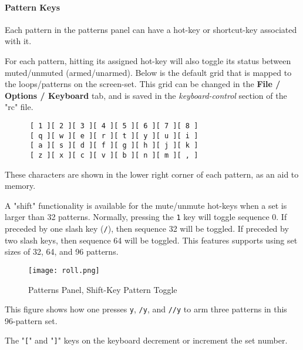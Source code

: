 \paragraph{Pattern Keys}
\label{paragraph:patterns_pattern_keys}

   Each pattern in the patterns panel can have a hot-key or shortcut-key
   associated with it.

   For each pattern, hitting its assigned hot-key will
   also toggle its status between muted/unmuted (armed/unarmed).
   Below is the default grid that is
   mapped to the loops/patterns on the screen-set.
   This grid can be changed in the
   \textbf{File / Options / Keyboard} tab, and is
   saved in the \textsl{keyboard-control} section of the
   "rc" file.

   \begin{verbatim}
      [ 1 ][ 2 ][ 3 ][ 4 ][ 5 ][ 6 ][ 7 ][ 8 ]
      [ q ][ w ][ e ][ r ][ t ][ y ][ u ][ i ]
      [ a ][ s ][ d ][ f ][ g ][ h ][ j ][ k ]
      [ z ][ x ][ c ][ v ][ b ][ n ][ m ][ , ]
   \end{verbatim}

   These characters are shown in the lower right corner of each
   pattern, as an aid to memory.

   A "shift" functionality is available for the
   mute/unmute hot-keys when a set is larger than 32 patterns.
   Normally, pressing the \texttt{1} key will toggle
   sequence 0.  If preceded by one slash key (\texttt{/}), then sequence 32
   will be toggled.  If preceded by two slash keys, then sequence 64 will be
   toggled.  This features supports using set sizes of 32, 64, and 96 patterns.

\begin{figure}[H]
   \centering 
   \texttt{[image: roll.png]}
   \caption{Patterns Panel, Shift-Key Pattern Toggle}
   \label{fig:pattern_window_shift_key_pattern_toggle}
\end{figure}

   This figure shows how one presses \texttt{y}, \texttt{/y}, and \texttt{//y}
   to arm three patterns in this 96-pattern set.

   \index{keys![}
   The "\texttt{[}" and
   \index{keys!]}
   "\texttt{]}" keys on the keyboard decrement or increment the set number.

